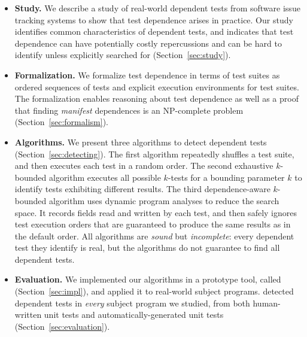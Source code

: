 \begin{itemize}

  \item \textbf{Study.} We describe a study of \dtnum real-world
  dependent tests from \repnum software issue tracking
  systems to show that test dependence
  arises in practice. Our study identifies common
  characteristics of dependent tests, and
  indicates that test dependence can have
  potentially costly repercussions and can be hard to identify unless
  explicitly searched for (Section~\ref{sec:study}).

\item \textbf{Formalization.} We formalize test dependence
  in terms of test suites as ordered sequences of tests and explicit execution
  environments for test suites.  The formalization enables reasoning about test dependence
  as well as a proof that finding \emph{manifest} dependences is an NP-complete
  problem (Section~\ref{sec:formalism}).

  \item \textbf{Algorithms.} We present three algorithms
  to detect dependent tests (Section~\ref{sec:detecting}).
  The first algorithm repeatedly shuffles a test suite,
  and then executes each test in a random order.
  The second exhaustive $k$-bounded algorithm
  executes all possible $k$-tests for
  a bounding parameter $k$ to identify tests exhibiting different results.
  The third dependence-aware $k$-bounded
  algorithm uses dynamic program analyses
  to reduce the search space. It records fields read and
  written by each test, and then safely ignores test execution orders
  that are guaranteed to produce the same results as in the default
  order. All algorithms are \emph{sound} but \emph{incomplete}:
  every dependent test they identify is real, but the algorithms
  do not guarantee to find all dependent tests. 

  \item \textbf{Evaluation.} We implemented our algorithms in a prototype
  tool, called \ourtool (Section~\ref{sec:impl}), and applied it to \subjnum real-world subject programs.
  \ourtool detected dependent tests in \textit{every}
  subject program we studied, from both human-written unit tests and automatically-generated
  unit tests (Section~\ref{sec:evaluation}).
\end{itemize}



